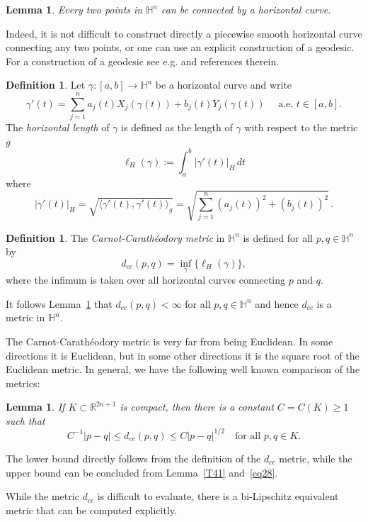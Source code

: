 \documentclass[intlimits,12pt,reqno]{amsart}
\newcommand{\bbbr}{\mathbb R}
\newcommand{\bbbh}{\mathbb H}
\numberwithin{equation}{section}
\newtheorem{lemma}[theorem]{Lemma}
\theoremstyle{definition}
\newtheorem{definition}[theorem]{Definition}
\begin{document}
\begin{lemma}
\label{T39}
Every two points in $\bbbh^n$ can be connected by a horizontal curve.
\end{lemma}
Indeed, it is not difficult to construct directly a piecewise smooth horizontal curve connecting any two points, or one can use an explicit construction of a geodesic. For a construction of a geodesic see e.g. \cite{HajlZ} and references therein.

\begin{definition}
Let $\gamma:[a,b] \to \bbbh^n$ be a horizontal curve and write
$$
\gamma'(t) = \sum_{j=1}^n a_j(t)X_j(\gamma(t)) + b_j(t)Y_j(\gamma(t)) \quad \text{ a.e. } t\in [a,b].
$$
The \emph{horizontal length} of $\gamma$
is defined as the length of $\gamma$ with  respect to the metric $g$
$$
\ell_H(\gamma) := \int_a^b |\gamma'(t)|_H \, dt
$$
where
$$
|\gamma'(t)|_H = \sqrt{\langle \gamma'(t),\gamma'(t) \rangle_g} = \sqrt{\sum_{j=1}^n (a_j(t))^2 + (b_j(t))^2}\, .
$$
\end{definition}
\begin{definition}
The \emph{Carnot-Carath\'{e}odory metric} in $\bbbh^n$
is defined for all $p,q\in \bbbh^n$ by
$$
d_{cc}(p,q) = \inf_{\gamma} \{ \ell_H(\gamma) \},
$$
where the infimum is taken over all horizontal curves
connecting $p$ and $q$.
\end{definition}
It follows Lemma~\ref{T39} that $d_{cc}(p,q)<\infty$ for all $p,q\in\bbbh^n$ and hence $d_{cc}$ is a metric in $\bbbh^n$.

The Carnot-Carath\'eodory metric is very far from being Euclidean. In some directions it is Euclidean, but in some other directions it is the square root of the Euclidean metric. In general, we have the following well known comparison of the metrics:
\begin{lemma}
\label{T40}
If $K \subset \bbbr^{2n+1}$ is compact,
then there is a constant $C = C(K) \geq 1$
such that
$$
C^{-1}|p-q| \leq d_{cc}(p,q) \leq C|p-q|^{1/2} 
\quad 
\text{for all $p,q \in K$.}
$$
\end{lemma}
The lower bound directly follows from the definition of the $d_{cc}$ metric, while the upper bound can be concluded from Lemma~\ref{T41} and~\eqref{eq28}.

While the metric $d_{cc}$ is difficult to evaluate, there is a bi-Lipschitz equivalent metric that can be computed explicitly.
\end{document}
